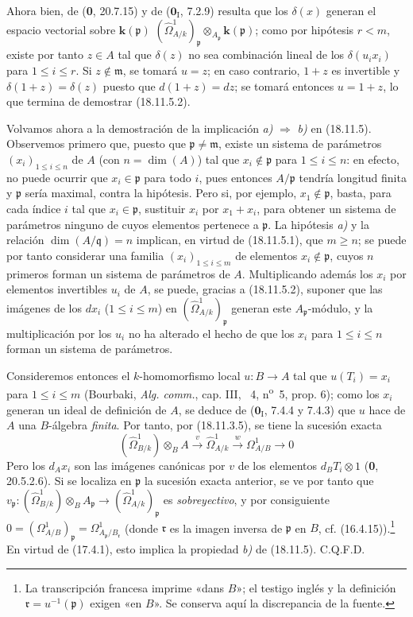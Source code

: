 Ahora bien, de (\textbf 0, 20.7.15) y de ($\mathbf{0}_{\mathrm I}$, 7.2.9) resulta que los $\delta(x)$ generan el espacio vectorial sobre $\boldsymbol{k}(\mathfrak p)$ $(\hat{\Omega}^1_{A/k})_{\mathfrak p}\otimes_{A_{\mathfrak p}}\boldsymbol{k}(\mathfrak p)$; 
como por hipótesis $r<m$, existe por tanto $z\in A$ tal que $\delta(z)$ no sea combinación lineal de los $\delta(u_ix_i)$ para $1\leq i\leq r$. Si $z\notin\mathfrak m$, se tomará $u=z$; en caso contrario, $1+z$ es invertible y $\delta(1+z)=\delta(z)$ puesto que $d(1+z)=dz$; se tomará entonces $u=1+z$, lo que termina de demostrar (18.11.5.2).

Volvamos ahora a la demostración de la implicación \emph{a)} $\Rightarrow$ \emph{b)} en (18.11.5). Observemos primero que, puesto que $\mathfrak p\neq\mathfrak m$, existe un sistema de parámetros $(x_i)_{1\leq i\leq n}$ de $A$ (con $n=\dim(A)$) tal que $x_i\notin\mathfrak p$ para $1\leq i\leq n$: en efecto, no puede ocurrir que $x_i\in\mathfrak p$ para todo $i$, pues entonces $A/\mathfrak p$ tendría longitud finita y $\mathfrak p$ sería maximal, contra la hipótesis. Pero si, por ejemplo, $x_1\notin\mathfrak p$, basta, para cada índice $i$ tal que $x_i\in\mathfrak p$, sustituir $x_i$ por $x_1+x_i$, para obtener un sistema de parámetros ninguno de cuyos elementos pertenece a $\mathfrak p$. La hipótesis \emph{a)} y la relación $\dim(A/\mathfrak q)=n$ implican, en virtud de (18.11.5.1), que $m\geq n$; se puede por tanto considerar una familia $(x_i)_{1\leq i\leq m}$ de elementos $x_i\notin\mathfrak p$, cuyos $n$ primeros forman un sistema de parámetros de $A$. Multiplicando además los $x_i$ por elementos invertibles $u_i$ de $A$, se puede, gracias a (18.11.5.2), suponer que las imágenes de los $dx_i$ ($1\leq i\leq m$) en $(\hat{\Omega}^1_{A/k})_{\mathfrak p}$ generan este $A_{\mathfrak p}$-módulo, y la multiplicación por los $u_i$ no ha alterado el hecho de que los $x_i$ para $1\leq i\leq n$ forman un sistema de parámetros.

Consideremos entonces el $k$-homomorfismo local $u:B\to A$ tal que $u(T_i)=x_i$ para $1\leq i\leq m$ (Bourbaki, \emph{Alg. comm.}, cap. III, \textsection~4, n\textsuperscript{o}~5, prop. 6); como los $x_i$ generan un ideal de definición de $A$, se deduce de ($\mathbf{0}_{\mathrm I}$, 7.4.4 y 7.4.3) que $u$ hace de $A$ una $B$-álgebra \emph{finita}. Por tanto, por (18.11.3.5), se tiene la sucesión exacta
\[
  (\hat{\Omega}^1_{B/k})\otimes_B A\xrightarrow{v}\hat{\Omega}^1_{A/k}\xrightarrow{w}\Omega^1_{A/B}\longrightarrow0
\]
Pero los $d_Ax_i$ son las imágenes canónicas por $v$ de los elementos $d_BT_i\otimes1$ (\textbf 0, 20.5.2.6). Si se localiza en $\mathfrak p$ la sucesión exacta anterior, se ve por tanto que $v_{\mathfrak p}:(\hat{\Omega}^1_{B/k})\otimes_B A_{\mathfrak p}\to(\hat{\Omega}^1_{A/k})_{\mathfrak p}$ es \emph{sobreyectivo}, y por consiguiente $0=(\Omega^1_{A/B})_{\mathfrak p}=\Omega^1_{A_{\mathfrak p}/B_{\mathfrak r}}$ (donde $\mathfrak r$ es la imagen inversa de $\mathfrak p$ en $B$, cf. (16.4.15)).\footnote{La transcripción francesa imprime «dans $B$»; el testigo inglés y la definición $\mathfrak r=u^{-1}(\mathfrak p)$ exigen «en $B$». Se conserva aquí la discrepancia de la fuente.} En virtud de (17.4.1), esto implica la propiedad \emph{b)} de (18.11.5). C.Q.F.D.

